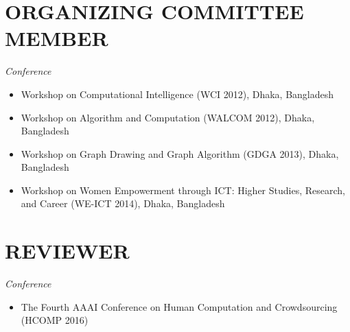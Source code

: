 \documentclass[11pt]{res}
\begin{document}
\begin{resume}
\begin{comment}
    \item  Ali S. Sabbir, Khosru Md. Salim, Md. Raihan B. Rafique, M Omar Rahman, {\bf Md Mustafizur Rahman}, Md. Hasanuzzaman Bhuiyan, Hasan S. Ferdous, and Syed I. Ahmed. ``Birth Record Communicator: A Pathway to Automated Health Data Acquisition System''. Workshop on Interactive Systems in Healthcare at Annual Symposium of the American Medical Informatics Association (AMIA), Washington, DC, USA, October 2011. 
    [Online]. Available: \urlstyle{same}\url{https://wish2011.wordpress.com/accepted-papers/}

    
   \end{comment}




\begin{comment}
\section{PROGRAM COMMITTEE MEMBER}
{\sl Conference}
\begin{itemize} \itemsep -2pt
\item The Fourth AAAI Conference on Human Computation and Crowdsourcing (HCOMP 2016), October 30 - November 3, 2016, Austin, TX, USA
 \end{itemize}
 \end{comment}

\section{ORGANIZING COMMITTEE MEMBER}
{\sl Conference}
\begin{itemize} \itemsep -2pt
\item Workshop on Computational Intelligence (WCI 2012), Dhaka, Bangladesh
\item Workshop on Algorithm and Computation (WALCOM 2012), Dhaka, Bangladesh
\item Workshop on Graph Drawing and Graph Algorithm (GDGA 2013), Dhaka, Bangladesh
\item Workshop on Women Empowerment through ICT: Higher
Studies, Research, and Career (WE-ICT 2014), Dhaka, Bangladesh

 \end{itemize} 


\section{REVIEWER}
{\sl Conference}
\begin{itemize} \itemsep -2pt
\item The Fourth AAAI Conference on Human Computation and Crowdsourcing (HCOMP 2016)
 \end{itemize}


\end{resume}
\end{document}
